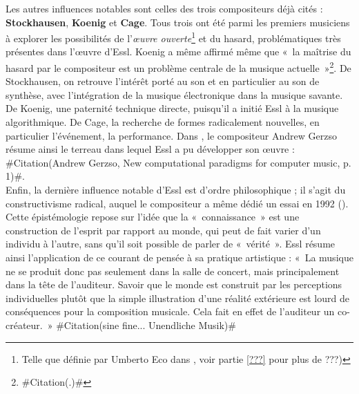 \documentclass[a4paper,12pt]{article}
\newcommand{\guill}[1]{«~#1~»}
\newcommand{\zitat}[2]{\#Citation(#2)\#}
\begin{document}
Les autres influences notables sont celles des trois compositeurs déjà cités : \textbf{Stockhausen}, \textbf{Koenig} et \textbf{Cage}. Tous trois ont été parmi les premiers musiciens à explorer les possibilités de l'\emph{œuvre ouverte}\footnote{Telle que définie par Umberto Eco dans \cite{eco1962opera}, voir partie \ref{???} pour plus de ???)} et du hasard, problématiques très présentes dans l'œuvre d'Essl. Koenig a même affirmé même que \guill{la maîtrise du hasard par le compositeur est un problème centrale de la musique actuelle}\footnote{\zitat{"die kompositorische Beherrschung des Zufalls ein zentrales Problem heutigen Komponierens" [G. M. Koenig, "Kommentar", S. 81]}.}. De Stockhausen, on retrouve l'intérêt porté au son et en particulier au son de synthèse, avec l'intégration de la musique électronique dans la musique savante. De Koenig, une paternité technique directe, puisqu'il a initié Essl à la musique algorithmique. De Cage, la recherche de formes radicalement nouvelles, en particulier l'événement, la performance. Dans \cite{GERZSO ???}, le compositeur Andrew Gerzso résume ainsi le terreau dans lequel Essl a pu développer son œuvre : \zitat{Schönberg dealt a blow to tonality and Cage to the notion of what constitutes a work --- opening the way to the notion of \emph{work in progress} or \emph{open-ended} works.}
{Andrew Gerzso, New computational paradigms for computer music, p. 1}.\\
Enfin, la dernière influence notable d'Essl est d'ordre philosophique ; il s'agit du constructivisme radical, auquel le compositeur a même dédié un essai en 1992 (\cite{RADIKAL???}). Cette épistémologie repose sur l'idée que la \guill{connaissance} est une construction de l'esprit par rapport au monde, qui peut de fait varier d'un individu à l'autre, sans qu'il soit possible de parler de \guill{vérité}. Essl résume ainsi l'application de ce courant de pensée à sa pratique artistique : \guill{La musique ne se produit donc pas seulement dans la salle de concert, mais principalement dans la tête de l'auditeur. Savoir que le monde est construit par les perceptions individuelles plutôt que la simple illustration d'une réalité extérieure est lourd de conséquences pour la composition musicale. Cela fait en effet de l'auditeur un co-créateur.}
\zitat{Musik findet deshalb nicht allein im Konzertsaal, sondern vor allem im Kopf statt. Die Erkenntnis, dass die Welt nicht nur die Abbildung einer äußeren Wirklichkeit ist, sondern erst durch individuelle Wahrnehmungsarbeit konstruiert wird, führt zu radikalen Konsequenzen für die musikalische Komposition, die letztendlich den Hörer zum Mitschöpfer macht.}
{sine fine... Unendliche Musik}
\end{document}
